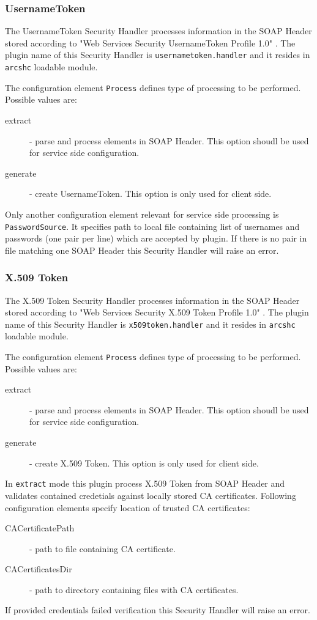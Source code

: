 \documentclass{article}
\begin{document}
\subsubsection{UsernameToken}\label{sec:unametoken-shc}
The UsernameToken Security Handler processes information in the SOAP Header
stored according to "Web Services Security UsernameToken Profile 1.0"
\cite{ws-security-usernametoken}. The plugin name of this Security Handler
is \texttt{usernametoken.handler} and it resides in \texttt{arcshc} loadable
module.

The configuration element \texttt{Process} defines type of processing to 
be performed. Possible values are:
\begin{description}
\item[extract] - parse and process elements in SOAP Header. This option
shoudl be used for service side configuration.
\item[generate] - create UsernameToken. This option is only used for client
side.
\end{description}

Only another configuration element relevant for service side processing is
\texttt{PasswordSource}. It specifies path to local file containing
list of usernames and passwords (one pair per line) which are accepted 
by plugin. If there is no pair in file matching one SOAP Header this 
Security Handler will raise an error.

\subsubsection{X.509 Token}\label{sec:x509token-shc}
The X.509 Token Security Handler processes information in the SOAP Header
stored according to "Web Services Security X.509 Token Profile 1.0"
\cite{ws-security-x509token}. The plugin name of this Security Handler
is \texttt{x509token.handler} and it resides in \texttt{arcshc} loadable
module.

The configuration element \texttt{Process} defines type of processing to 
be performed. Possible values are:
\begin{description}
\item[extract] - parse and process elements in SOAP Header. This option
shoudl be used for service side configuration.
\item[generate] - create X.509 Token. This option is only used for client
side.
\end{description}

In \texttt{extract} mode this plugin process X.509 Token from SOAP Header
and validates contained credetials against locally stored CA certificates.
Following configuration elements specify location of trusted CA certificates:
\begin{description}
\item[CACertificatePath] - path to file containing CA certificate.
\item[CACertificatesDir] - path to directory containing files with CA certificates.
\end{description}
If provided credentials failed verification this Security Handler will raise 
an error.
\end{document}
